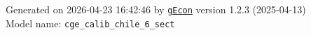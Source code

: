 \documentclass[10pt,a4paper]{article}
\numberwithin{equation}{section}
\begin{document}
\begin{landscape}
\begin{flushleft}{\large
Generated  on 2026-04-23 16:42:46 by \href{http://gecon.r-forge.r-project.org/}{\texttt{gEcon}} version 1.2.3 (2025-04-13)\\
Model name: \verb+cge_calib_chile_6_sect+
}\end{flushleft}


\end{landscape}

\end{document}

